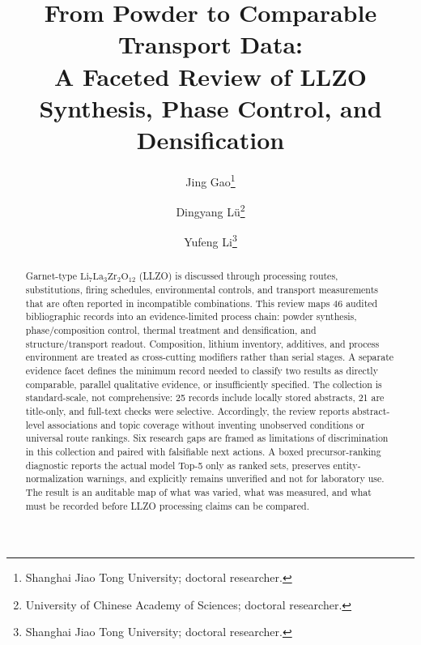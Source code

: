 \documentclass[11pt]{article}
\title{\textbf{From Powder to Comparable Transport Data:}\\
\textbf{A Faceted Review of LLZO Synthesis, Phase Control, and Densification}}
\author{Jing Gao\thanks{Shanghai Jiao Tong University; doctoral researcher.}
\and Dingyang L\"u\thanks{University of Chinese Academy of Sciences; doctoral researcher.}
\and Yufeng Li\thanks{Shanghai Jiao Tong University; doctoral researcher.}}
\date{}
\newcommand{\chem}[1]{\ensuremath{\mathrm{#1}}}
\begin{document}
\maketitle

\begin{abstract}
Garnet-type \chem{Li_7La_3Zr_2O_{12}} (LLZO) is discussed through processing routes, substitutions, firing schedules, environmental controls, and transport measurements that are often reported in incompatible combinations. This review maps 46 audited bibliographic records into an evidence-limited process chain: powder synthesis, phase/composition control, thermal treatment and densification, and structure/transport readout. Composition, lithium inventory, additives, and process environment are treated as cross-cutting modifiers rather than serial stages. A separate evidence facet defines the minimum record needed to classify two results as directly comparable, parallel qualitative evidence, or insufficiently specified. The collection is standard-scale, not comprehensive: 25 records include locally stored abstracts, 21 are title-only, and full-text checks were selective. Accordingly, the review reports abstract-level associations and topic coverage without inventing unobserved conditions or universal route rankings. Six research gaps are framed as limitations of discrimination in this collection and paired with falsifiable next actions. A boxed precursor-ranking diagnostic reports the actual model Top-5 only as ranked sets, preserves entity-normalization warnings, and explicitly remains unverified and not for laboratory use. The result is an auditable map of what was varied, what was measured, and what must be recorded before LLZO processing claims can be compared.
\end{abstract}













\clearpage


\end{document}
